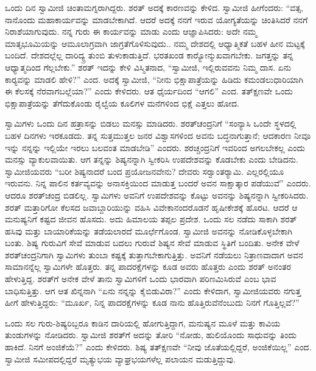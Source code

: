  ಒಂದು ದಿನ ಸ್ವಾಮೀಜಿ ಚಿಂತಾಮಗ್ನರಾಗಿದ್ದರು. ಶರತ್ ಅದಕ್ಕೆ ಕಾರಣವನ್ನು ಕೇಳಿದ. ಸ್ವಾಮೀಜಿ ಹೀಗೆಂದರು: “ವತ್ಸ, ನಾನೊಂದು ಮಹಾಕಾರ್ಯವನ್ನು ಮಾಡಬೇಕಾಗಿದೆ. ಆದರೆ ಅದಕ್ಕೆ ನನಗೆ ಇರುವ ಯೋಗ್ಯತೆಯನ್ನು ಚಿಂತಿಸಿದರೆ ನನಗೆ ನಿರಾಶೆಯಾಗುವುದು. ನನ್ನ ಗುರು ಈ ಕಾರ್ಯವನ್ನು ಮಾಡು ಎಂದು ಆಜ್ಞಾಪಿಸಿದರು: ಅದೇ ನಮ್ಮ ಮಾತೃಭೂಮಿಯನ್ನು ಆಮೂಲಾಗ್ರವಾಗಿ ಜಾಗ್ರತೆಗೊಳಿಸುವುದು.. ನಮ್ಮ ದೇಶದಲ್ಲಿ ಆಧ್ಯಾತ್ಮಿಕತೆ ಬಹಳ ಹೀನ ಮಟ್ಟಕ್ಕೆ ಬಂದಿದೆ. ದೇಶದಲ್ಲೆಲ್ಲ ದಾರಿದ್ಯ್ರ ತುಂಬಿ ತುಳುಕಾಡುತ್ತಿದೆ. ಭರತಖಂಡ ಕಾರ‍್ಯೋನ್ಮುಖವಾಗಬೇಕು. ಜಗತ್ತನ್ನು ತನ್ನ ಆಧ್ಯಾತ್ಮದಿಂದ ಗೆಲ್ಲಬೇಕು.” ಶರತ್ ಇದನ್ನು ಕೇಳಿ ವಿಸ್ಮಿತನಾದ, “ಸ್ವಾಮೀಜಿ, ಇಲ್ಲಿರುವವನು ನಿಮ್ಮ ದಾಸ. ಏನು ಕಾರ‍್ಯವನ್ನು ಮಾಡಲಿ ಹೇಳಿ?” ಎಂದ. ಅದಕ್ಕೆ ಸ್ವಾಮೀಜಿ, “ನೀನು ಭಿಕ್ಷಾಪಾತ್ರೆಯನ್ನು ಹಿಡಿದು ಕಮಂಡಲುಧಾರಿಯಾಗಿ ಈ ಕೆಲಸಕ್ಕೆ ನೆರವಾಗಬಲ್ಲೆಯಾ?” ಎಂದು ಕೇಳಿದರು. ಆತ ಧೈರ್ಯದಿಂದ “ಆಗಲಿ” ಎಂದ. ತತ್‍ಕ್ಷಣವೇ ಒಂದು ಭಿಕ್ಷಾಪಾತ್ರೆಯನ್ನು ತೆಗೆದುಕೊಂಡು ರೈಲ್ವೆಯ ಕೂಲಿಗಳ ಮನೆಗಳಿಂದ ಭಿಕ್ಷೆ ಎತ್ತಲು ಹೋದ. 

 ಸ್ವಾಮಿಗಳು ಒಂದು ದಿನ ಹತ್ರಾಸನ್ನು ಬಿಡಲು ಮನಸ್ಸು ಮಾಡಿದರು. ಶರತ್‍ಚಂದ್ರನಿಗೆ “ಸಂನ್ಯಾಸಿ ಒಂದೇ ಸ್ಥಳದಲ್ಲಿ ಬಹಳ ದಿನಗಳು ಇರಕೂಡದು. ತನ್ನ ಸುತ್ತಮುತ್ತಲ ಜನರ ವಿಶ್ವಾಸಗಳಿಂದ ಅವನು ಬದ್ಧನಾಗುತ್ತಾನೆ; ಆದಕಾರಣ ನೀವೂ ಇನ್ನು ನನ್ನನ್ನು ಇಲ್ಲಿಯೇ ಇರಲು ಬಲವಂತ ಮಾಡಬೇಡಿ” ಎಂದರು. ಶರಚ್ಚಂದ್ರನಿಗೆ ಇವರಿಂದ ಅಗಲಬೇಕಲ್ಲ ಎಂದು ಮನಸ್ಸು ವ್ಯಾಕುಲವಾಯಿತು. ಆಗ ತನ್ನನ್ನು ಶಿಷ್ಯನನ್ನಾಗಿ ಸ್ವೀಕರಿಸಿ ಉಪದೇಶವನ್ನು ಕೊಡಬೇಕು ಎಂದು ಬೇಡಿದನು. ಸ್ವಾಮೀಜಿಯವರು “ಬರೀ ಶಿಷ್ಯನಾದರೆ ಬಂದ ಪ್ರಯೋಜನವೇನು? ದೇವರು ಸರ‍್ವಾಂತರ‍್ಯಾಮಿ. ಎಲ್ಲರಲ್ಲಿಯೂ ಇರುವನು. ನಿನ್ನ ಪಾಲಿನ ಕರ್ತವ್ಯವನ್ನು ಅನಾಸಕ್ತಿಯಿಂದ ಮಾಡುತ್ತ ಬಂದರೆ ಅವನ ಸಾಕ್ಷಾತ್ಕಾರ ಪಡೆಯುವೆ” ಎಂದರು. ಆದರೂ ಶರತ್‍ಚಂದ್ರ ಬಿಡಲಿಲ್ಲ. ಸ್ವಾಮಿಗಳು ಅವನಿಗೆ ಉಪದೇಶವನ್ನು ಕೊಟ್ಟು ಅವನನ್ನು ಶಿಷ್ಯನನ್ನಾಗಿ ಸ್ವೀಕರಿಸಿದರು. ಶರತ್ ಮತ್ತಾರಿಗೋ ಕೆಲಸದ ಜವಾಬ್ದಾರಿಯುನ್ನು ವಹಿಸಿ ವಿವೇಕಾನಂದರೊಡನೆ ಹೃಷೀಕೇಶಕ್ಕೆ ಹೊರಟ. ಆದರೆ ಆ ಮನುಷ್ಯನಿಗೆ ಕಷ್ಟದ ಜೀವನ ಹೊಸದು. ಅದು ಹಿಮಾಲಯ ತಪ್ಪಲ ಪ್ರದೇಶ. ಒಂದು ಸಲ ನಡೆದು ಸಾಕಾಗಿ ಶರತ್ ಹಸಿವು ಮತ್ತು ಬಾಯಾರಿಕೆಯನ್ನು ತಡೆಯಲಾರದೆ ಮೂರ್ಛೆಗೊಂಡ. ಸ್ವಾಮೀಜಿ ಅವನನ್ನು ನೋಡಿಕೊಳ್ಳಬೇಕಾಗಿ ಬಂತು. ಶಿಷ್ಯ ಗುರುವಿಗೆ ಸೇವೆ ಮಾಡುವ ಬದಲು ಗುರುವೆ ಶಿಷ್ಯನ ಸೇವೆ ಮಾಡುವ ಸ್ಥಿತಿಗೆ ಬಂದಿತು. ಅನೇಕ ವೇಳೆ ಶರತ್‍ಚಂದ್ರನಿಗಾಗಿ ಸ್ವಾಮಿಗಳು ತುಂಬಾ ಕಷ್ಟಕ್ಕೆ ತುತ್ತಾಗಬೇಕಾಗುತ್ತಿತ್ತು. ಅವನಿಗೆ ನಡೆಯಲು ನಿತ್ರಾಣವಾದಾಗ ಅವನ ಸಾಮಾನನ್ನೆಲ್ಲ ಸ್ವಾಮಿಗಳೇ ಹೊತ್ತರು. ತನ್ನ ಪಾದರಕ್ಷೆಗಳನ್ನು ಕೂಡ ಅವರು ಹೊತ್ತರು ಎಂದು ಶರತ್ ಅನಂತರ ಹೇಳುತ್ತಿದ್ದ. ಶರತ್‍ಗೆ ಅನೇಕ ವೇಳೆ ತಾನು ಸ್ವಾಮಿಗಳಿಗೆ ಒಂದು ಭಾರವಾಗಿ ಪರಿಣಮಿಸಿರುವೆ ಎಂಬ ಭಾವ ಬಾಧಿಸುತ್ತಿತ್ತು. ಆಗ ಆತ ಖಿನ್ನನಾಗಿ “ಏನು ನನ್ನನ್ನು ಕೈಬಿಡುವಿರಾ?” ಎಂದು ಕೇಳಿದಾಗ, ಸ್ವಾಮೀಜಿಯವರು ನಗುತ್ತ ಹೀಗೆ ಹೇಳುತ್ತಿದ್ದರು: “ಮೂರ್ಖ, ನಿನ್ನ ಪಾದರಕ್ಷೆಗಳನ್ನು ಕೂಡ ನಾನು ಹೊತ್ತಿರುವೆನೆಂಬುದು ನಿನಗೆ ಗೊತ್ತಿಲ್ಲವೆ?” 

 ಒಂದು ಸಲ ಗುರು-ಶಿಷ್ಯರಿಬ್ಬರೂ ಕಾಡಿನ ದಾರಿಯಲ್ಲಿ ಹೋಗುತ್ತಿದ್ದಾಗ, ಮನುಷ್ಯನ ಮೂಳೆ ಮತ್ತು ಕಾವಿಯ ತುಂಡುಗಳನ್ನು ನೋಡಿದರು. ಸ್ವಾಮೀಜಿ ಶರತ್‍ಗೆ ಅದನ್ನು ತೋರಿ “ನೋಡು, ಹುಲಿಯೊಂದು ಸಾಧುವನ್ನು ತಿಂದು ಹಾಕಿದೆ. ನಿನಗೆ ಅಂಜಿಕೆಯೆ?” ಎಂದು ಕೇಳಿದರು. ಶಿಷ್ಯ ತತ್‍ಕ್ಷಣವೇ “ನೀವು ಜೊತೆಯಲ್ಲಿದ್ದರೆ, ಅಂಜಿಕೆಯಿಲ್ಲ” ಎಂದ. ಸ್ವಾಮೀಜಿ ಸಮೀಪದಲ್ಲಿದ್ದರೆ ಮೃತ್ಯುಭಯ ವ್ಯಾಘ್ರಭಯಗಳೆಲ್ಲ ಪಲಾಯನ ಮಡುತ್ತಿದ್ದುವು. 

